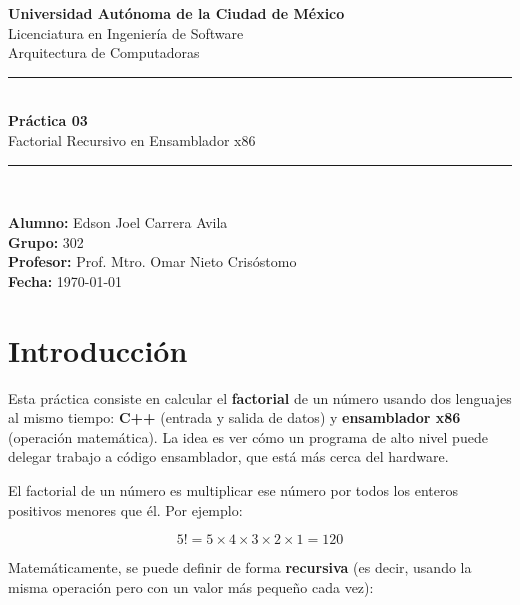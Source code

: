 \documentclass[12pt, letterpaper]{article}
\begin{document}
\begin{titlepage}
    \centering
    \vspace*{1.5cm}

    {\Large \textbf{Universidad Autónoma de la Ciudad de México}}\\[0.3cm]
    {\large Licenciatura en Ingeniería de Software}\\[0.2cm]
    {\large Arquitectura de Computadoras}\\[2.5cm]

    \rule{\linewidth}{0.5pt}\\[0.4cm]
    {\LARGE \bfseries Práctica 03}\\[0.3cm]
    {\Large Factorial Recursivo en Ensamblador x86}\\[0.3cm]
    \rule{\linewidth}{0.5pt}\\[2cm]

    \begin{flushleft}
        \textbf{Alumno:} Edson Joel Carrera Avila \\[0.3cm]
        \textbf{Grupo:} 302 \\[0.3cm]
        \textbf{Profesor:} Prof. Mtro. Omar Nieto Crisóstomo \\[0.3cm]
        \textbf{Fecha:} \today
    \end{flushleft}
    \vfill
\end{titlepage}

\tableofcontents
\newpage

\section{Introducción}

Esta práctica consiste en calcular el \textbf{factorial} de un número usando dos lenguajes al mismo tiempo: \textbf{C++} (entrada y salida de datos) y \textbf{ensamblador x86} (operación matemática). La idea es ver cómo un programa de alto nivel puede delegar trabajo a código ensamblador, que está más cerca del hardware.

El factorial de un número es multiplicar ese número por todos los enteros positivos menores que él. Por ejemplo:

\begin{equation}
    5! = 5 \times 4 \times 3 \times 2 \times 1 = 120
\end{equation}

Matemáticamente, se puede definir de forma \textbf{recursiva} (es decir, usando la misma operación pero con un valor más pequeño cada vez):
\end{document}

